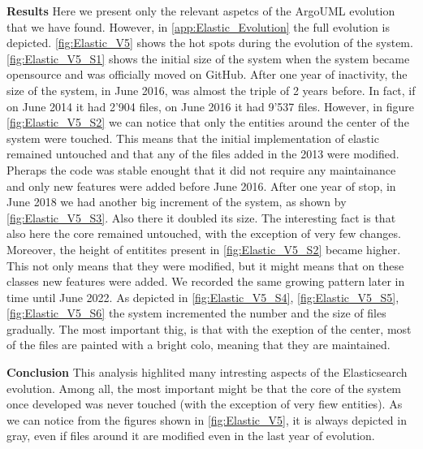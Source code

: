 \textbf{Results}
Here we present only the relevant aspetcs of the ArgoUML evolution that we have found. However, in \autoref{app:Elastic_Evolution} the full evolution is depicted. \autoref{fig:Elastic_V5} shows the hot spots during the evolution of the system. \autoref{fig:Elastic_V5_S1} shows the initial size of the system when the system became opensource and was officially moved on GitHub. After one year of inactivity, the size of the system, in June 2016, was almost the triple of 2 years before. In fact, if on June 2014 it had 2'904 files, on June 2016 it had 9'537 files. However, in figure \autoref{fig:Elastic_V5_S2} we can notice that only the entities around the center of the system were touched. This means that the initial implementation of elastic remained untouched and that any of the files added in the 2013 were modified. Pheraps the code was stable enought that it did not require any maintainance and only new features were added before June 2016. After one year of stop, in June 2018 we had another big increment of the system, as shown by \autoref{fig:Elastic_V5_S3}. Also there it doubled its size. The interesting fact is that also here the core remained untouched, with the exception of very few changes. Moreover, the height of entitites present in \autoref{fig:Elastic_V5_S2} became higher. This not only means that they were modified, but it might means that on these classes new features were added. We recorded the same growing pattern later in time until June 2022. As depicted in \autoref{fig:Elastic_V5_S4}, \autoref{fig:Elastic_V5_S5}, \autoref{fig:Elastic_V5_S6} the system incremented the number and the size of files gradually. The most important thig, is that with the exeption of the center, most of the files are painted with a bright colo, meaning that they are maintained. 


\bigbreak
\textbf{Conclusion} This analysis highlited many intresting aspects of the Elasticsearch evolution. Among all, the most important might be that the core of the system once developed was never touched (with the exception of very fiew entities). As we can notice from the figures shown in  \autoref{fig:Elastic_V5}, it is always depicted in gray, even if files around it are modified even in the last year of evolution. 


